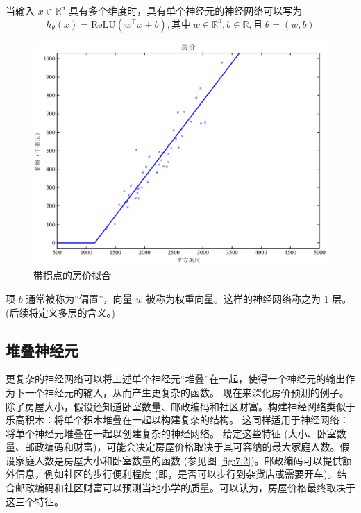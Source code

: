 当输入 $x \in \mathbb{R}^d$ 具有多个维度时，具有单个神经元的神经网络可以写为
\begin{equation}
    \bar{h}_\theta(x) = \text{ReLU}(w^\top x + b), \text{其中}\  w \in \mathbb{R}^d, b \in \mathbb{R}, \text{且}\  \theta = (w, b)
    \label{eq:7.12}
\end{equation}

\begin{figure}[H]
    \centering
    \includegraphics[width=0.5\linewidth]{figs/house_dataset_relu.pdf}
    \caption{带拐点的房价拟合}
    \label{fig:7.1}
\end{figure}

项 $b$ 通常被称为“偏置”，向量 $w$ 被称为权重向量。这样的神经网络称之为 1 层。(后续将定义多层的含义。)

\subsection*{堆叠神经元}

更复杂的神经网络可以将上述单个神经元“堆叠”在一起，使得一个神经元的输出作为下一个神经元的输入，从而产生更复杂的函数。
现在来深化房价预测的例子。除了房屋大小，假设还知道卧室数量、邮政编码和社区财富。构建神经网络类似于乐高积木：将单个积木堆叠在一起以构建复杂的结构。 这同样适用于神经网络：将单个神经元堆叠在一起以创建复杂的神经网络。
给定这些特征 (大小、卧室数量、邮政编码和财富)，可能会决定房屋价格取决于其可容纳的最大家庭人数。假设家庭人数是房屋大小和卧室数量的函数 (参见图 \ref{fig:7.2})。邮政编码可以提供额外信息，例如社区的步行便利程度 (即，是否可以步行到杂货店或需要开车)。结合邮政编码和社区财富可以预测当地小学的质量。可以认为，房屋价格最终取决于这三个特征。

